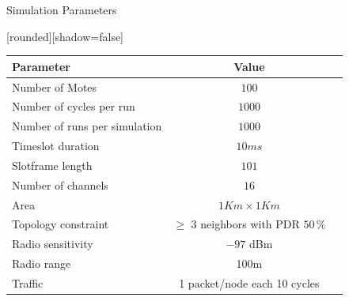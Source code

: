 \begin{withoutheadline}
\begin{frame}{Simulation Parameters}


[rounded][shadow=false]

\begin{center}
\begin{tabular}{l*{1}{c}r}
Parameter              & Value  \\
\hline
Number of Motes & $100$ \\
Number of cycles per run     & $1000$ \\
Number of runs per simulation     & $1000$ \\
Timeslot duration    & $10ms$ \\
Slotframe length     & $101$\\
Number of channels   & $16$ \\
Area            & $1Km\times1Km$ \\
Topology constraint     & $\geq$ 3 neighbors with PDR $50\,\%$ \\
Radio sensitivity           & $-97$ dBm \\
Radio range     & 100m \\
Traffic & 1 packet/node each 10 cycles 
\end{tabular}
\end{center}





\end{frame}
\end{withoutheadline}


